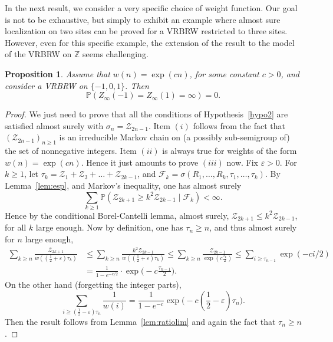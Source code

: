\documentclass[11pt]{article}
\newtheorem {prop} {Proposition} [section]
\newcommand{\1}{{\text{\Large $\mathfrak 1$}}}
\begin{document}
In the next result, we consider a very specific choice of weight function. Our goal is not to be exhaustive, but simply 
to exhibit an example where almost sure localization on 
two sites can be proved for a VRBRW restricted to three sites. However, even for this specific example, the extension of the result to the model of the VRBRW on $\mathbb Z$ seems challenging. 
\begin{prop}\label{prop:appVRBRW}
Assume that $w(n) = \exp(cn)$, for some constant $c>0$, and consider a VRBRW on $\{-1,0,1\}$. Then  
$$\mathbb  P(Z_\infty(-1)= Z_\infty(1) = \infty)= 0. $$ 
\end{prop}
\begin{proof}
We just need to prove that all the conditions of Hypothesis~\ref{hypo2} are satisfied almost surely with $\sigma_n = \mathcal Z_{2n-1}$. Item $(i)$ follows from the fact that $(\mathcal Z_{2n-1})_{n\ge 1}$ is an irreducible Markov chain on (a possibly sub-semigroup of) the set of nonnegative integers. Item $(ii)$ is always true for weights of the form $w(n) = \exp(cn)$. Hence it just amounts to prove $(iii)$ now. Fix $\varepsilon>0$. For $k\ge 1$, let $\tau_k = \mathcal Z_1 + \mathcal Z_3 + \dots + \mathcal Z_{2k-1}$, and $\mathcal F_k = \sigma(R_1,\dots,R_k,\tau_1,\dots,\tau_k)$. By Lemma~\ref{lem:esp}, and Markov's inequality, one has almost surely 
$$\sum_{k\ge 1} \mathbb P(\mathcal Z_{2k+1} \ge k^2 \mathcal Z_{2k-1}\mid \mathcal F_k) < \infty. $$ 
Hence by the conditional Borel-Cantelli lemma, almost surely, $\mathcal Z_{2k+1} \le k^2 \mathcal Z_{2k-1}$, for all $k$ large enough. 
Now by definition, one has $\tau_n \ge n$, and thus almost surely for $n$ large enough, 
 \begin{align*}
\sum_{k\ge n} \frac{\mathcal Z_{2k+1}}{w((\frac 12 + \varepsilon)\tau_k)} & \le \sum_{k\ge n} \frac{k^2\mathcal Z_{2k-1}}{w((\frac 12 + \varepsilon)\tau_k)} 
\le \sum_{k\ge n} \frac{\mathcal Z_{2k-1}}{\exp(c\frac{\tau_k}{2})} 
 \le  \sum_{i\ge \tau_{n-1}} \exp(-ci/2)  \\
 & = \frac{1}{1- e^{-c/2}}\cdot \exp\big(-c\frac{ \tau_{n-1}}{2}\big).   
\end{align*}
On the other hand (forgetting the integer parts), 
$$\sum_{i\ge (\frac 12 - \varepsilon)\tau_n} \frac 1{w(i)} = \frac 1{1- e^{-c}} \exp\big(-c(\frac 12- \varepsilon)\tau_n\big). $$
Then the result follows from Lemma~\ref{lem:ratiolim} and again the fact that $\tau_n\ge n$.  
\end{proof}
\end{document}
